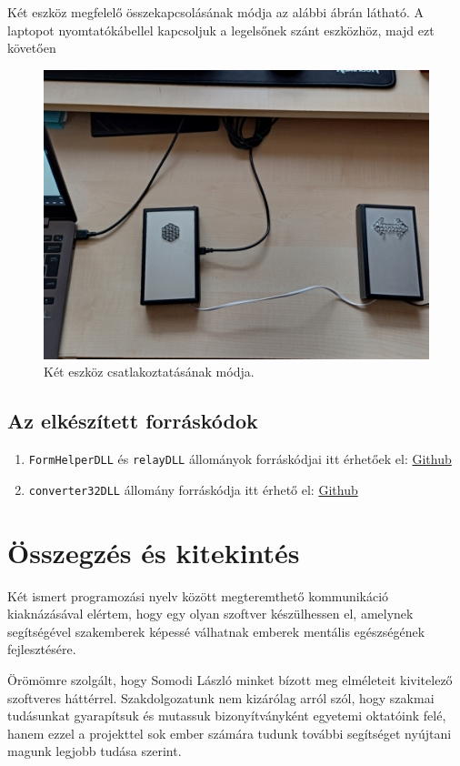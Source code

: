 \documentclass[tocnopagenum]{thesis-ekf}
\begin{document}
	Két eszköz megfelelő összekapcsolásának módja az alábbi ábrán látható. A laptopot nyomtatókábellel kapcsoljuk a legelsőnek szánt eszközhöz, majd ezt követően 
	\begin{figure}[H]
		\centering
		\includegraphics[scale=0.5]{images/foto_sorbakotes.jpg}
		\caption{Két eszköz csatlakoztatásának módja.}
		\label{fig:foto_sorbakotes}
	\end{figure}
	
	\subsection{Az elkészített forráskódok}
	\begin{enumerate}
		\item \verb*|FormHelperDLL| és \verb*|relayDLL| állományok forráskódjai itt érhetőek el: \hyperref{https://github.com/nagytoth1/dzkbx0_thesis_repo}{}{}{Github}
		\item \verb*|converter32DLL| állomány forráskódja itt érhető el: \hyperref{https://github.com/nagytoth1/jsonConverterC/}{}{}{Github}
	\end{enumerate}
	
	\section{Összegzés és kitekintés}
	Két ismert programozási nyelv között megteremthető kommunikáció kiaknázásával elértem, hogy egy olyan szoftver készülhessen el, amelynek segítségével szakemberek képessé válhatnak emberek mentális egészségének fejlesztésére. 
	
	Örömömre szolgált, hogy Somodi László minket bízott meg elméleteit kivitelező szoftveres háttérrel. Szakdolgozatunk nem kizárólag arról szól, hogy szakmai tudásunkat gyarapítsuk és mutassuk bizonyítványként egyetemi oktatóink felé, hanem ezzel a projekttel sok ember számára tudunk további segítséget nyújtani magunk legjobb tudása szerint.
	
\end{document}

